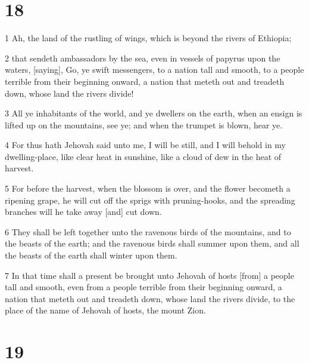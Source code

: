 \chapter{18}

\par 1 Ah, the land of the rustling of wings, which is beyond the rivers of Ethiopia;
\par 2 that sendeth ambassadors by the sea, even in vessels of papyrus upon the waters, [saying], Go, ye swift messengers, to a nation tall and smooth, to a people terrible from their beginning onward, a nation that meteth out and treadeth down, whose land the rivers divide!
\par 3 All ye inhabitants of the world, and ye dwellers on the earth, when an ensign is lifted up on the mountains, see ye; and when the trumpet is blown, hear ye.
\par 4 For thus hath Jehovah said unto me, I will be still, and I will behold in my dwelling-place, like clear heat in sunshine, like a cloud of dew in the heat of harvest.
\par 5 For before the harvest, when the blossom is over, and the flower becometh a ripening grape, he will cut off the sprigs with pruning-hooks, and the spreading branches will he take away [and] cut down.
\par 6 They shall be left together unto the ravenous birds of the mountains, and to the beasts of the earth; and the ravenous birds shall summer upon them, and all the beasts of the earth shall winter upon them.
\par 7 In that time shall a present be brought unto Jehovah of hosts [from] a people tall and smooth, even from a people terrible from their beginning onward, a nation that meteth out and treadeth down, whose land the rivers divide, to the place of the name of Jehovah of hosts, the mount Zion.

\chapter{19}

